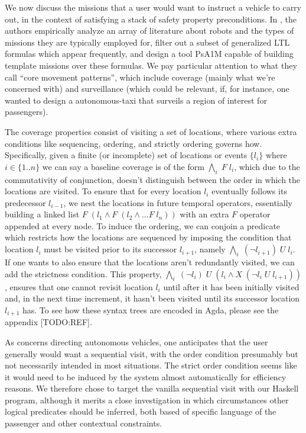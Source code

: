 \documentclass{article}
\begin{document}
We now discuss the missions that a user would want to instruct a vehicle to
carry out, in the context of satisfying a stack of safety property
preconditions. In \cite{specPat}, the authors empirically analyze an array of
literature about robots and the types of missions they are typically employed
for, filter out a subset of generalized LTL formulas which appear frequently,
and design a tool PsA1M capable of building template missions over these formulas.
We pay particular attention to what they call ``core movement patterns'', which
include coverage (mainly what we're concerned with) and surveillance (which
could be relevant, if, for instance, one wanted to design a autonomous-taxi that
surveils a region of interest for passengers).

The coverage properties consist of visiting a set of locations, where various
extra conditions like sequencing, ordering, and strictly ordering governs how.
Specifically, given a finite (or incomplete) set of locations or events
$\{l_i\}$ where $i \in \{1..n\}$ we can say a baseline coverage is of the form
$\underset{i}{\bigwedge}\; F\; l_i$, which due to the commutativity of
conjunction, doesn't distinguish between the order in which the locations are
visited. To ensure that for every location $l_i$ eventually follows its
predecessor $l_{i-1}$, we nest the locations in future temporal operators,
essentially building a linked list $F\; (l_1 \wedge F\; (l_{2} \wedge ... F\;
l_{n}))$ with an extra $F$ operator appended at every node. To induce the
ordering, we can conjoin a predicate which restricts how the locations are
sequenced by imposing the condition that location $l_{i}$ must be visited prior
to its successor $l_{i+1}$, namely $\underset{i}{\bigwedge}\; (\neg l_{i+1})\;
U\; l_i$. If one wants to also ensure that the locations aren't redundantly
visited, we can add the strictness condition. This property,
$\underset{i}{\bigwedge}\; (\neg l_{i})\; U\; (l_i \wedge X\; (\neg l_i\; U\;
l_{i+1}))$, ensures that one cannot revisit location $l_i$ until after it has
been initially visited and, in the next time increment, it hasn't been visited
until its successor location $l_{i+1}$ has. To see how these syntax trees are
encoded in Agda, please see the appendix [TODO:REF].

As concerns directing autonomous vehicles, one anticipates that the user
generally would want a sequential visit, with the order condition presumably but
not necessarily intended in most situations. The strict order condition seems
like it would need to be induced by the system almost automatically for
efficiency reasons. We therefore chose to target the vanilla sequential visit
with our Haskell program, although it merits a close investigation in which
circumstances other logical predicates should be inferred, both based of
specific language of the passenger and other contextual constraints.
\end{document}
